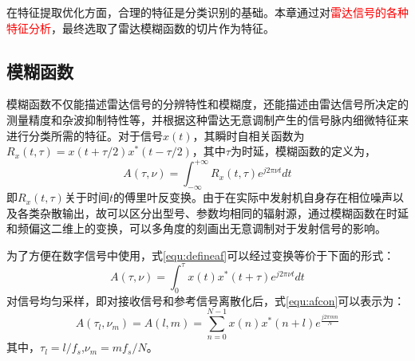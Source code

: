 在特征提取优化方面，合理的特征是分类识别的基础。本章通过对\textcolor{red}{雷达信号的各种特征分析}，最终选取了雷达模糊函数的切片作为特征。

\subsection{模糊函数}

模糊函数不仅能描述雷达信号的分辨特性和模糊度，还能描述由雷达信号所决定的测量精度和杂波抑制特性等，并根据这种雷达无意调制产生的信号脉内细微特征来进行分类所需的特征。对于信号$x(t)$，其瞬时自相关函数为$R_x(t,\tau)=x(t+\tau/2)x^{*}(t-\tau/2)$，其中$\tau$为时延，模糊函数的定义为，
\begin{equation}
A(\tau,\nu) = \int_{-\infty}^{+\infty}R_x(t,\tau)e^{j2\pi\nu t}dt
\label{equ:defineaf}
\end{equation}
即$R_x(t,\tau)$关于时间$t$的傅里叶反变换。由于在实际中发射机自身存在相位噪声以及各类杂散输出，故可以区分出型号、参数均相同的辐射源，通过模糊函数在时延和频偏这二维上的变换，可以多角度的刻画出无意调制对于发射信号的影响。

为了方便在数字信号中使用，式\ref{equ:defineaf}可以经过变换等价于下面的形式：
\begin{equation}
A(\tau,\nu) = \int_{0}^{\tau}x(t)x^{*}(t+\tau)e^{j2\pi\nu t}dt
\label{equ:afcon}
\end{equation}
对信号均匀采样，即对接收信号和参考信号离散化后，式\ref{equ:afcon}可以表示为：
\begin{equation}
A(\tau_l,\nu_m) = A(l, m) = \sum_{n = 0}^{N-1}x(n)x^{*}(n+l)e^{\frac{j2\pi m n}{N}}	
\end{equation}
其中，$\tau_l=l/f_s$,$\nu_m=mf_s/N$。

